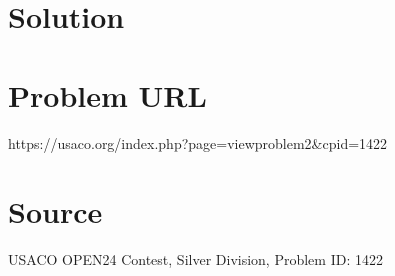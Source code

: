 \documentclass[12pt]{article}
\begin{document}
\section*{Solution}


\section*{Problem URL}
https://usaco.org/index.php?page=viewproblem2&cpid=1422

\section*{Source}
USACO OPEN24 Contest, Silver Division, Problem ID: 1422
\end{document}
